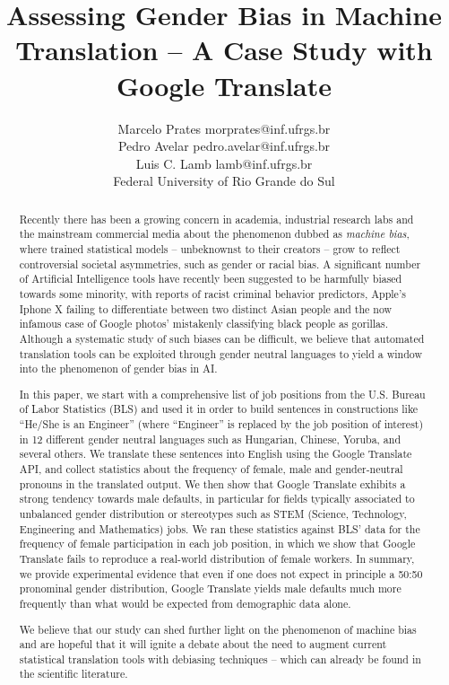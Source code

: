 \documentclass[twoside,11pt]{article}
\begin{document}
\title{Assessing Gender Bias in Machine Translation -- A Case Study with Google Translate}

\author{\name Marcelo Prates \email morprates@inf.ufrgs.br \\
\name Pedro Avelar \email pedro.avelar@inf.ufrgs.br \\
\name Luis C. Lamb \email lamb@inf.ufrgs.br \\
\addr Federal University of Rio Grande do Sul}

\maketitle

\begin{abstract}
Recently there has been a growing concern in academia, industrial research labs and the mainstream commercial media about the phenomenon dubbed as \emph{machine bias}, where trained statistical models -- unbeknownst to their creators -- grow to reflect controversial societal asymmetries, such as gender or racial bias. A significant number of Artificial Intelligence tools have recently been suggested to be harmfully biased towards some minority, with reports of racist criminal behavior predictors, Apple's Iphone X failing to differentiate between two distinct Asian people and the now infamous case of Google photos' mistakenly classifying black people as gorillas. Although a systematic study of such biases can be difficult, we believe that automated translation tools can be exploited through gender neutral languages to yield a window into the phenomenon of gender bias in AI.

In this paper,  we start with a comprehensive list of job positions from the U.S. Bureau of Labor Statistics (BLS) and used it in order to build sentences in constructions like ``He/She is an Engineer'' (where ``Engineer'' is replaced by the job position of interest) in 12 different gender neutral languages such as Hungarian, Chinese, Yoruba, and several others. We translate these sentences into English using the Google Translate API, and collect statistics about the frequency of female, male and gender-neutral pronouns in the translated output. We then show that Google Translate exhibits a strong tendency towards male defaults,  in particular for fields typically associated to unbalanced gender distribution or  stereotypes such as STEM (Science, Technology, Engineering and Mathematics) jobs. We ran these statistics against BLS' data for the frequency of female participation in each job position, in which we show that Google Translate fails to reproduce a real-world distribution of female workers. In summary, we provide experimental evidence that even if one does not expect in principle a 50:50 pronominal gender distribution, Google Translate yields male defaults much more frequently than what would be expected from demographic data alone.

We believe that our study can shed further light on the phenomenon of machine bias and are hopeful that it will ignite a debate about the need to augment current statistical translation tools with debiasing techniques -- which can already be found in the scientific literature.
\end{abstract}
\end{document}
